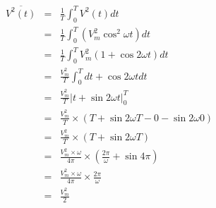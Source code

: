 \documentclass[a4paper,12pt]{article}
\begin{document}
\begin{eqnarray*}
\overline{V^{2}(t)} & = & \frac{1}{T} \int^{T}_{0} V^{2}(t)  dt \\
						  & = & \frac{1}{T} \int^{T}_{0} (V_{m}^{2} \cos^{2}{\omega t}) dt \\
						  & = & \frac{1}{T} \int^{T}_{0} V_{m}^{2} (1 + \cos{2 \omega t}) dt \\
						  & = & \frac{V_{m}^{2}}{T} \int^{T}_{0} dt + \cos{2 \omega t} dt \\
						  & = & \frac{V_{m}^{2}}{T} \left| t + \sin{2 \omega t} \right|^{T}_{0} \\
						  & = & \frac{V_{m}^{2}}{T} \times \left(T + \sin{2 \omega T} - 0 - \sin{2 \omega 0} \right) \\
						  & = & \frac{V_{m}^{2}}{T} \times \left(T + \sin{2 \omega T} \right) \\
						  & = & \frac{V_{m}^{2} \times \omega}{4 \pi} \times \left(\frac{2 \pi}{\omega} + \sin{4 \pi} \right) \\
						  & = & \frac{V_{m}^{2} \times \omega}{4 \pi} \times \frac{2 \pi}{\omega} \\
						  & = & \frac{V_{m}^{2}}{2}
\end{eqnarray*}
\end{document}
